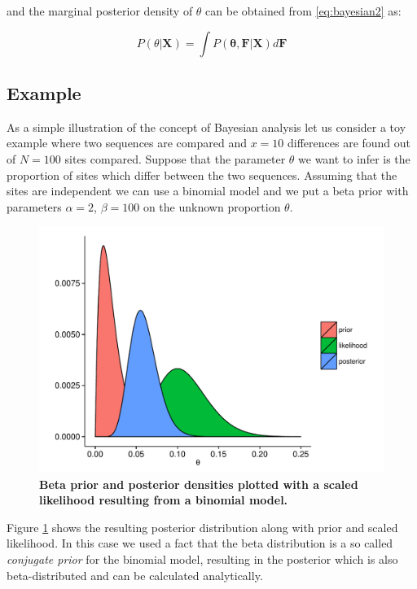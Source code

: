 \documentclass[12pt,twoside]{mitthesis}
\theoremstyle{plain}
\theoremstyle{definition}
\theoremstyle{remark}
\begin{document}
\noindent
and the marginal posterior density of $\theta$ can be obtained from \ref{eq:bayesian2} as:

\begin{equation}
P\left(\theta|\mathbf{X}\right)=\int P\left(\mathbf{\theta},\mathbf{F}|\mathbf{X}\right)d\mathbf{F}
\label{eq:bayesian3}
\end{equation}


\subsection{Example}

As a simple illustration of the concept of Bayesian analysis let us consider a toy example where two sequences are compared and $x=10$ differences are found out of $N=100$ sites compared.
Suppose that the parameter $\theta$ we want to infer is the proportion of sites which differ between the two sequences.
Assuming that the sites are independent we can use a binomial model and we put a beta prior with parameters $\alpha=2$, $\beta=100$ on the unknown proportion $\theta$.

\begin{figure}[H]
\begin{center}
\includegraphics[scale=0.5]{bayes} 
\end{center}
\caption{{ \footnotesize {\bf Beta prior and posterior densities plotted with a scaled likelihood resulting from a binomial model.} 
}}
\label{fig:bayes1}
\end{figure}

Figure \ref{fig:bayes1} shows the resulting posterior distribution along with prior and scaled likelihood.
In this case we used a fact that the beta distribution is a so called \emph{conjugate prior} for the binomial model, resulting in the posterior which is also beta-distributed and can be calculated analytically.
\end{document}
